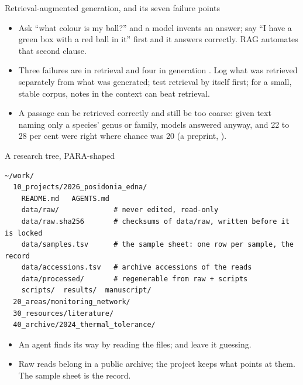 \documentclass[11pt,aspectratio=169]{beamer}
\begin{document}
\begin{frame}{Retrieval-augmented generation, and its seven failure points}
  \small
  \begin{itemize}
    \item Ask ``what colour is my ball?'' and a model invents an answer; say
      ``I have a green box with a red ball in it'' first and it answers
      correctly. RAG automates that second clause.
    \item Three failures are in retrieval and four in generation
      \parencite{kurniawan2024ragfailures}. Log what was retrieved separately
      from what was generated; test retrieval by itself first; for a small,
      stable corpus, notes in the context can beat retrieval.
    \item A passage can be retrieved correctly and still be too coarse:
      given text naming only a species' genus or family, models answered
      anyway, and 22 to 28 per cent were right where chance was 20 (a
      preprint, \cite{rayeed2026clade}).
  \end{itemize}
\end{frame}

\begin{frame}[fragile]{A research tree, PARA-shaped}
\begin{lstlisting}[style=shell]
~/work/
  10_projects/2026_posidonia_edna/
    README.md   AGENTS.md
    data/raw/             # never edited, read-only
    data/raw.sha256       # checksums of data/raw, written before it is locked
    data/samples.tsv      # the sample sheet: one row per sample, the record
    data/accessions.tsv   # archive accessions of the reads
    data/processed/       # regenerable from raw + scripts
    scripts/  results/  manuscript/
  20_areas/monitoring_network/
  30_resources/literature/
  40_archive/2024_thermal_tolerance/
\end{lstlisting}
  \small
  \begin{itemize}
    \item An agent finds its way by reading the files;  and
       leave it guessing.
    \item Raw reads belong in a public archive; the project keeps what points
      at them. The sample sheet is the record.
  \end{itemize}
\end{frame}
\end{document}

